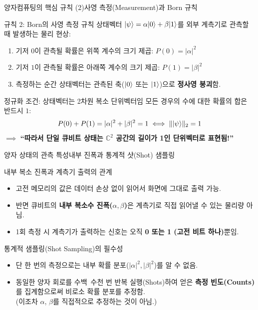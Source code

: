 \documentclass[aspectratio=169, 10pt]{beamer}
\begin{document}
\begin{frame}{양자컴퓨팅의 핵심 규칙 (2)}{사영 측정(Measurement)과 Born 규칙}
    \begin{alertblock}{규칙 2: Born의 사영 측정 규칙}
        상태벡터 $|\psi\rangle = \alpha|0\rangle + \beta|1\rangle$를 외부 계측기로 관측할 때 발생하는 물리 현상:\pause
        \begin{enumerate}
            \item 기저 $0$이 관측될 확률은 위쪽 계수의 크기 제곱: $P(0) = |\alpha|^2$
            \item 기저 $1$이 관측될 확률은 아래쪽 계수의 크기 제곱: $P(1) = |\beta|^2$\pause
            \item 측정하는 순간 상태벡터는 관측된 축($|0\rangle$ 또는 $|1\rangle$)으로 \textbf{정사영 붕괴}함.
        \end{enumerate}
    \end{alertblock}\pause
    \vspace{0.15cm}
    \begin{block}{정규화 조건: 상태벡터는 2차원 복소 단위벡터임}
        모든 경우의 수에 대한 확률의 합은 반드시 $1$:
        $$P(0) + P(1) = |\alpha|^2 + |\beta|^2 = 1 \iff \||\psi\rangle\|_2 = 1$$\pause
        $\implies$ \textbf{``따라서 단일 큐비트 상태는 $\mathbb{C}^2$ 공간의 길이가 1인 단위벡터로 표현됨!''}
    \end{block}
\end{frame}

\begin{frame}{양자 상태의 관측 특성}{내부 진폭과 통계적 샷(Shot) 샘플링}\pause
    \begin{block}{내부 복소 진폭과 계측기 출력의 관계}
        \begin{itemize}
            \item 고전 메모리의 값은 데이터 손상 없이 읽어서 화면에 그대로 출력 가능.\pause
            \item 반면 큐비트의 \textbf{내부 복소수 진폭($\alpha, \beta$)}은 계측기로 직접 읽어낼 수 있는 물리량 아님.\pause
            \item 1회 측정 시 계측기가 출력하는 신호는 오직 \textbf{0 또는 1 (고전 비트 하나)}뿐임.
        \end{itemize}
    \end{block}\pause
    \vspace{0.2cm}
    \begin{exampleblock}{통계적 샘플링(Shot Sampling)의 필수성}
        \begin{itemize}
            \item 단 한 번의 측정으로는 내부 확률 분포($|\alpha|^2, |\beta|^2$)를 알 수 없음.\pause
            \item 동일한 양자 회로를 수백~수천 번 반복 실행(Shots)하여 얻은 \textbf{측정 빈도(Counts)}를 집계함으로써 비로소 확률 분포를 추정함.\\ \pause(이조차 $\alpha$, $\beta$를 직접적으로 추정하는 것이 아님.)
        \end{itemize}
    \end{exampleblock}
\end{frame}
\end{document}
